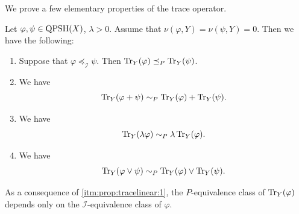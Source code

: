 We prove a few elementary properties of the trace operator.
\begin{proposition}\label{prop:tracelinear}
    Let $\varphi,\psi\in \mathrm{QPSH}(X)$, $\lambda>0$. Assume that $\nu(\varphi,Y)=\nu(\psi,Y)=0$.
    Then we have the following:
    \begin{enumerate}
        \item\label{itm:prop:tracelinear:1} Suppose that $\varphi\preceq_{\mathcal{I}}\psi$. Then $\operatorname{Tr}_Y(\varphi)\preceq_P \operatorname{Tr}_Y(\psi)$.
        \item\label{itm:prop:tracelinear:2} We have
            \[
                \operatorname{Tr}_Y(\varphi+\psi)\sim_P \operatorname{Tr}_Y(\varphi)+\operatorname{Tr}_Y(\psi).
            \]
        \item\label{itm:prop:tracelinear:3} We have
            \[
                \operatorname{Tr}_Y(\lambda\varphi)\sim_P \lambda\operatorname{Tr}_Y(\varphi).
            \]
        \item\label{itm:prop:tracelinear:4} We have
            \[
                \operatorname{Tr}_Y(\varphi\lor \psi)\sim_P \operatorname{Tr}_Y(\varphi)\lor \operatorname{Tr}_Y(\psi).
            \]
    \end{enumerate}
\end{proposition}
As a consequence of \ref{itm:prop:tracelinear:1}, the $P$-equivalence class of $\operatorname{Tr}_Y(\varphi)$ depends only on the $\mathcal{I}$-equivalence class of $\varphi$.
